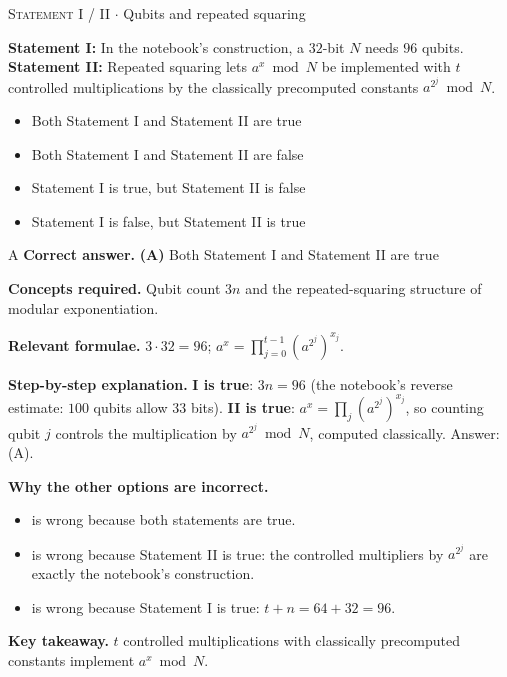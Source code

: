 \documentclass[11pt,a4paper]{article}
\newcommand{\optlabel}[1]{\textbf{(#1)}}
\newcommand{\correctlabel}[1]{\textcolor{okgreen}{\textbf{(#1)}\,\ding{51}}}
\newenvironment{qitem}[1]{\begin{list}{}{\setlength{\leftmargin}{3.3em}\setlength{\labelwidth}{3.1em}%
  \setlength{\labelsep}{0.2em}\setlength{\topsep}{3pt}\setlength{\parsep}{3pt}}\item[\textbf{Q.#1}\hfill]}{\end{list}}
\newcommand{\qsep}{\par\vspace{2pt}{\color{black!15}\hrule}\vspace{4pt}}
\newcommand{\qmeta}[2]{{\footnotesize\color{black!60}\textsc{#1} \;$\cdot$\; #2}\par}
\begin{document}
\begin{qitem}{78}
\qmeta{Statement I / II}{Qubits and repeated squaring}
\textbf{Statement I:} In the notebook's construction, a $32$-bit $N$ needs $96$ qubits.\\[1mm]
\textbf{Statement II:} Repeated squaring lets $a^x \bmod N$ be implemented with $t$ controlled multiplications by the classically precomputed constants $a^{2^j} \bmod N$.
\begin{itemize}[leftmargin=2.6em, labelsep=0.4em, itemsep=2pt, topsep=3pt]
\item[\correctlabel{A}] Both Statement I and Statement II are true
\item[\optlabel{B}] Both Statement I and Statement II are false
\item[\optlabel{C}] Statement I is true, but Statement II is false
\item[\optlabel{D}] Statement I is false, but Statement II is true
\end{itemize}
\end{qitem}
\begin{solbox}{A}
\textbf{\color{brand}Correct answer.} \textcolor{okgreen}{\textbf{(A)}} Both Statement I and Statement II are true

\textbf{\color{brand}Concepts required.} Qubit count $3n$ and the repeated-squaring structure of modular exponentiation.

\textbf{\color{brand}Relevant formulae.} $3\cdot32 = 96$; $a^x = \prod_{j=0}^{t-1}(a^{2^j})^{x_j}$.

\textbf{\color{brand}Step-by-step explanation.} \textbf{I is true}: $3n = 96$ (the notebook's reverse estimate: $100$ qubits allow $33$ bits). \textbf{II is true}: $a^x = \prod_j(a^{2^j})^{x_j}$, so counting qubit $j$
controls the multiplication by $a^{2^j} \bmod N$, computed classically. Answer: (A).

\textbf{\color{brand}Why the other options are incorrect.}
\begin{itemize}[leftmargin=2.4em, itemsep=1pt, topsep=2pt]
\item[\textbf{(B)}] is wrong because both statements are true.
\item[\textbf{(C)}] is wrong because Statement II is true: the controlled multipliers by $a^{2^j}$ are exactly the notebook's construction.
\item[\textbf{(D)}] is wrong because Statement I is true: $t + n = 64 + 32 = 96$.
\end{itemize}
\textbf{\color{brand}Key takeaway.} $t$ controlled multiplications with classically precomputed constants implement $a^x \bmod N$.
\end{solbox}
\qsep
\end{document}
